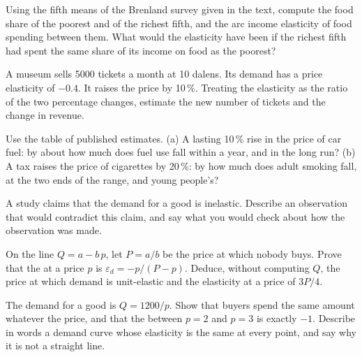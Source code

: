 \begin{exercise}[$\star\star$]\label{exo:g10:elasticities:9}
Using the fifth means of the Brenland survey given in the text, compute the food share of the poorest and of the richest fifth, and the arc income
elasticity of food spending between them. What would the elasticity have been if the richest fifth had spent the same share of its income on food as
the poorest?
\end{exercise}

\begin{exercise}[$\star\star$]\label{exo:g10:elasticities:10}
A museum sells \num{5000} tickets a month at 10 dalens. Its demand has a price elasticity of $-0.4$. It raises the price by 10\,\%. Treating the
elasticity as the ratio of the two percentage changes, estimate the new number of tickets and the change in revenue.
\end{exercise}

\begin{exercise}[$\star\star$]\label{exo:g10:elasticities:11}
Use the table of published estimates. (a) A lasting 10\,\% rise in the price of car fuel: by about how much does fuel use fall within a year, and in the
long run? (b) A tax raises the price of cigarettes by 20\,\%: by how much does adult smoking fall, at the two ends of the range, and young people's?
\end{exercise}

\begin{exercise}[$\star\star\star$]\label{exo:g10:elasticities:12}
A study claims that the demand for a good is inelastic. Describe an observation that would contradict this claim, and say what you would check about how
the observation was made.
\end{exercise}

\begin{exercise}[$\star\star\star$]\label{exo:g10:elasticities:13}
On the line $Q = a - b\,p$, let $P = a/b$ be the price at which nobody buys. Prove that the  at a price $p$ is $\varepsilon_d = -p/(P - p)$.
Deduce, without computing $Q$, the price at which demand is unit-elastic and the elasticity at a price of $3P/4$.
\end{exercise}

\begin{exercise}[$\star\star\star$]\label{exo:g10:elasticities:14}
The demand for a good is $Q = 1200/p$. Show that buyers spend the same amount whatever the price, and that the  between $p = 2$ and $p = 3$ is
exactly $-1$. Describe in words a demand curve whose elasticity is the same at every point, and say why it is not a straight line.
\end{exercise}

